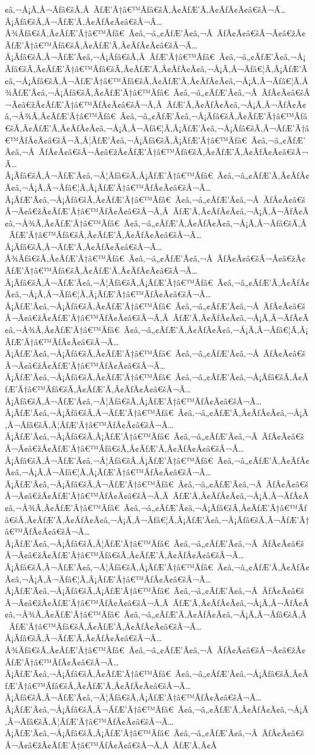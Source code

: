 \documentclass{article}
\begin{document}
\begin{outline}[enumerate]
¢â‚¬Å¡Ã‚Â¬Ãƒâ€šÃ‚Â ÃƒÆ’Ã†â€™Ãƒâ€šÃ‚Â¢ÃƒÆ’Ã‚Â¢ÃƒÂ¢Ã¢â€šÂ¬Ã…Â¡Ãƒâ€šÃ‚Â¬ÃƒÆ’Ã‚Â¢ÃƒÂ¢Ã¢â€šÂ¬Ã…Â¾Ãƒâ€šÃ‚Â¢ÃƒÆ’Ã†â€™Ãƒâ€ Ã¢â‚¬â„¢ÃƒÆ’Ã¢â‚¬Â ÃƒÂ¢Ã¢â€šÂ¬Ã¢â€žÂ¢ÃƒÆ’Ã†â€™Ãƒâ€šÃ‚Â¢ÃƒÆ’Ã‚Â¢ÃƒÂ¢Ã¢â€šÂ¬Ã…Â¡Ãƒâ€šÃ‚Â¬ÃƒÆ’Ã¢â‚¬Å¡Ãƒâ€šÃ‚Â ÃƒÆ’Ã†â€™Ãƒâ€ Ã¢â‚¬â„¢ÃƒÆ’Ã¢â‚¬Å¡Ãƒâ€šÃ‚Â¢ÃƒÆ’Ã†â€™Ãƒâ€šÃ‚Â¢ÃƒÆ’Ã‚Â¢ÃƒÂ¢Ã¢â‚¬Å¡Ã‚Â¬Ãƒâ€¦Ã‚Â¡ÃƒÆ’Ã¢â‚¬Å¡Ãƒâ€šÃ‚Â¬ÃƒÆ’Ã†â€™Ãƒâ€šÃ‚Â¢ÃƒÆ’Ã‚Â¢ÃƒÂ¢Ã¢â‚¬Å¡Ã‚Â¬Ãƒâ€¦Ã‚Â¾ÃƒÆ’Ã¢â‚¬Å¡Ãƒâ€šÃ‚Â¢ÃƒÆ’Ã†â€™Ãƒâ€ Ã¢â‚¬â„¢ÃƒÆ’Ã¢â‚¬Â ÃƒÂ¢Ã¢â€šÂ¬Ã¢â€žÂ¢ÃƒÆ’Ã†â€™ÃƒÂ¢Ã¢â€šÂ¬Ã‚Â ÃƒÆ’Ã‚Â¢ÃƒÂ¢Ã¢â‚¬Å¡Ã‚Â¬ÃƒÂ¢Ã¢â‚¬Å¾Ã‚Â¢ÃƒÆ’Ã†â€™Ãƒâ€ Ã¢â‚¬â„¢ÃƒÆ’Ã¢â‚¬Å¡Ãƒâ€šÃ‚Â¢ÃƒÆ’Ã†â€™Ãƒâ€šÃ‚Â¢ÃƒÆ’Ã‚Â¢ÃƒÂ¢Ã¢â‚¬Å¡Ã‚Â¬Ãƒâ€¦Ã‚Â¡ÃƒÆ’Ã¢â‚¬Å¡Ãƒâ€šÃ‚Â¬ÃƒÆ’Ã†â€™ÃƒÂ¢Ã¢â€šÂ¬Ã‚Â¦ÃƒÆ’Ã¢â‚¬Å¡Ãƒâ€šÃ‚Â¡ÃƒÆ’Ã†â€™Ãƒâ€ Ã¢â‚¬â„¢ÃƒÆ’Ã¢â‚¬Â ÃƒÂ¢Ã¢â€šÂ¬Ã¢â€žÂ¢ÃƒÆ’Ã†â€™Ãƒâ€šÃ‚Â¢ÃƒÆ’Ã‚Â¢ÃƒÂ¢Ã¢â€šÂ¬Ã…Â¡Ãƒâ€šÃ‚Â¬ÃƒÆ’Ã¢â‚¬Â¦Ãƒâ€šÃ‚Â¡ÃƒÆ’Ã†â€™Ãƒâ€ Ã¢â‚¬â„¢ÃƒÆ’Ã‚Â¢ÃƒÂ¢Ã¢â‚¬Å¡Ã‚Â¬Ãƒâ€¦Ã‚Â¡ÃƒÆ’Ã†â€™ÃƒÂ¢Ã¢â€šÂ¬Ã…Â¡ÃƒÆ’Ã¢â‚¬Å¡Ãƒâ€šÃ‚Â¢ÃƒÆ’Ã†â€™Ãƒâ€ Ã¢â‚¬â„¢ÃƒÆ’Ã¢â‚¬Â ÃƒÂ¢Ã¢â€šÂ¬Ã¢â€žÂ¢ÃƒÆ’Ã†â€™ÃƒÂ¢Ã¢â€šÂ¬Ã‚Â ÃƒÆ’Ã‚Â¢ÃƒÂ¢Ã¢â‚¬Å¡Ã‚Â¬ÃƒÂ¢Ã¢â‚¬Å¾Ã‚Â¢ÃƒÆ’Ã†â€™Ãƒâ€ Ã¢â‚¬â„¢ÃƒÆ’Ã‚Â¢ÃƒÂ¢Ã¢â‚¬Å¡Ã‚Â¬Ãƒâ€šÃ‚Â ÃƒÆ’Ã†â€™Ãƒâ€šÃ‚Â¢ÃƒÆ’Ã‚Â¢ÃƒÂ¢Ã¢â€šÂ¬Ã…Â¡Ãƒâ€šÃ‚Â¬ÃƒÆ’Ã‚Â¢ÃƒÂ¢Ã¢â€šÂ¬Ã…Â¾Ãƒâ€šÃ‚Â¢ÃƒÆ’Ã†â€™Ãƒâ€ Ã¢â‚¬â„¢ÃƒÆ’Ã¢â‚¬Â ÃƒÂ¢Ã¢â€šÂ¬Ã¢â€žÂ¢ÃƒÆ’Ã†â€™Ãƒâ€šÃ‚Â¢ÃƒÆ’Ã‚Â¢ÃƒÂ¢Ã¢â€šÂ¬Ã…Â¡Ãƒâ€šÃ‚Â¬ÃƒÆ’Ã¢â‚¬Â¦Ãƒâ€šÃ‚Â¡ÃƒÆ’Ã†â€™Ãƒâ€ Ã¢â‚¬â„¢ÃƒÆ’Ã‚Â¢ÃƒÂ¢Ã¢â‚¬Å¡Ã‚Â¬Ãƒâ€¦Ã‚Â¡ÃƒÆ’Ã†â€™ÃƒÂ¢Ã¢â€šÂ¬Ã…Â¡ÃƒÆ’Ã¢â‚¬Å¡Ãƒâ€šÃ‚Â¢ÃƒÆ’Ã†â€™Ãƒâ€ Ã¢â‚¬â„¢ÃƒÆ’Ã¢â‚¬Â ÃƒÂ¢Ã¢â€šÂ¬Ã¢â€žÂ¢ÃƒÆ’Ã†â€™ÃƒÂ¢Ã¢â€šÂ¬Ã‚Â ÃƒÆ’Ã‚Â¢ÃƒÂ¢Ã¢â‚¬Å¡Ã‚Â¬ÃƒÂ¢Ã¢â‚¬Å¾Ã‚Â¢ÃƒÆ’Ã†â€™Ãƒâ€ Ã¢â‚¬â„¢ÃƒÆ’Ã‚Â¢ÃƒÂ¢Ã¢â‚¬Å¡Ã‚Â¬Ãƒâ€¦Ã‚Â¡ÃƒÆ’Ã†â€™ÃƒÂ¢Ã¢â€šÂ¬Ã…Â¡ÃƒÆ’Ã¢â‚¬Å¡Ãƒâ€šÃ‚Â¢ÃƒÆ’Ã†â€™Ãƒâ€ Ã¢â‚¬â„¢ÃƒÆ’Ã¢â‚¬Â ÃƒÂ¢Ã¢â€šÂ¬Ã¢â€žÂ¢ÃƒÆ’Ã†â€™ÃƒÂ¢Ã¢â€šÂ¬Ã…Â¡ÃƒÆ’Ã¢â‚¬Å¡Ãƒâ€šÃ‚Â¢ÃƒÆ’Ã†â€™Ãƒâ€ Ã¢â‚¬â„¢ÃƒÆ’Ã¢â‚¬Å¡Ãƒâ€šÃ‚Â¢ÃƒÆ’Ã†â€™Ãƒâ€šÃ‚Â¢ÃƒÆ’Ã‚Â¢ÃƒÂ¢Ã¢â€šÂ¬Ã…Â¡Ãƒâ€šÃ‚Â¬ÃƒÆ’Ã¢â‚¬Â¦Ãƒâ€šÃ‚Â¡ÃƒÆ’Ã†â€™ÃƒÂ¢Ã¢â€šÂ¬Ã…Â¡ÃƒÆ’Ã¢â‚¬Å¡Ãƒâ€šÃ‚Â¬ÃƒÆ’Ã†â€™Ãƒâ€ Ã¢â‚¬â„¢ÃƒÆ’Ã‚Â¢ÃƒÂ¢Ã¢â‚¬Å¡Ã‚Â¬Ãƒâ€šÃ‚Â¦ÃƒÆ’Ã†â€™ÃƒÂ¢Ã¢â€šÂ¬Ã…Â¡ÃƒÆ’Ã¢â‚¬Å¡Ãƒâ€šÃ‚Â¡ÃƒÆ’Ã†â€™Ãƒâ€ Ã¢â‚¬â„¢ÃƒÆ’Ã¢â‚¬Â ÃƒÂ¢Ã¢â€šÂ¬Ã¢â€žÂ¢ÃƒÆ’Ã†â€™Ãƒâ€šÃ‚Â¢ÃƒÆ’Ã‚Â¢ÃƒÂ¢Ã¢â€šÂ¬Ã…Â¡Ãƒâ€šÃ‚Â¬ÃƒÆ’Ã¢â‚¬Â¦Ãƒâ€šÃ‚Â¡ÃƒÆ’Ã†â€™Ãƒâ€ Ã¢â‚¬â„¢ÃƒÆ’Ã‚Â¢ÃƒÂ¢Ã¢â‚¬Å¡Ã‚Â¬Ãƒâ€¦Ã‚Â¡ÃƒÆ’Ã†â€™ÃƒÂ¢Ã¢â€šÂ¬Ã…Â¡ÃƒÆ’Ã¢â‚¬Å¡Ãƒâ€šÃ‚Â¬ÃƒÆ’Ã†â€™Ãƒâ€ Ã¢â‚¬â„¢ÃƒÆ’Ã¢â‚¬Â ÃƒÂ¢Ã¢â€šÂ¬Ã¢â€žÂ¢ÃƒÆ’Ã†â€™ÃƒÂ¢Ã¢â€šÂ¬Ã‚Â ÃƒÆ’Ã‚Â¢ÃƒÂ¢Ã¢â‚¬Å¡Ã‚Â¬ÃƒÂ¢Ã¢â‚¬Å¾Ã‚Â¢ÃƒÆ’Ã†â€™Ãƒâ€ Ã¢â‚¬â„¢ÃƒÆ’Ã¢â‚¬Å¡Ãƒâ€šÃ‚Â¢ÃƒÆ’Ã†â€™Ãƒâ€šÃ‚Â¢ÃƒÆ’Ã‚Â¢ÃƒÂ¢Ã¢â‚¬Å¡Ã‚Â¬Ãƒâ€¦Ã‚Â¡ÃƒÆ’Ã¢â‚¬Å¡Ãƒâ€šÃ‚Â¬ÃƒÆ’Ã†â€™ÃƒÂ¢Ã¢â€šÂ¬Ã…Â¡ÃƒÆ’Ã¢â‚¬Å¡Ãƒâ€šÃ‚Â¦ÃƒÆ’Ã†â€™Ãƒâ€ Ã¢â‚¬â„¢ÃƒÆ’Ã¢â‚¬Â ÃƒÂ¢Ã¢â€šÂ¬Ã¢â€žÂ¢ÃƒÆ’Ã†â€™Ãƒâ€šÃ‚Â¢ÃƒÆ’Ã‚Â¢ÃƒÂ¢Ã¢â€šÂ¬Ã…Â¡Ãƒâ€šÃ‚Â¬ÃƒÆ’Ã¢â‚¬Â¦Ãƒâ€šÃ‚Â¡ÃƒÆ’Ã†â€™Ãƒâ€ Ã¢â‚¬â„¢ÃƒÆ’Ã‚Â¢ÃƒÂ¢Ã¢â‚¬Å¡Ã‚Â¬Ãƒâ€¦Ã‚Â¡ÃƒÆ’Ã†â€™ÃƒÂ¢Ã¢â€šÂ¬Ã…Â¡ÃƒÆ’Ã¢â‚¬Å¡Ãƒâ€šÃ‚Â¡ÃƒÆ’Ã†â€™Ãƒâ€ Ã¢â‚¬â„¢ÃƒÆ’Ã¢â‚¬Â ÃƒÂ¢Ã¢â€šÂ¬Ã¢â€žÂ¢ÃƒÆ’Ã†â€™ÃƒÂ¢Ã¢â€šÂ¬Ã‚Â ÃƒÆ’Ã‚Â¢ÃƒÂ¢Ã¢â‚¬Å¡Ã‚Â¬ÃƒÂ¢Ã¢â‚¬Å¾Ã‚Â¢ÃƒÆ’Ã†â€™Ãƒâ€ Ã¢â‚¬â„¢ÃƒÆ’Ã‚Â¢ÃƒÂ¢Ã¢â‚¬Å¡Ã‚Â¬Ãƒâ€šÃ‚Â ÃƒÆ’Ã†â€™Ãƒâ€šÃ‚Â¢ÃƒÆ’Ã‚Â¢ÃƒÂ¢Ã¢â€šÂ¬Ã…Â¡Ãƒâ€šÃ‚Â¬ÃƒÆ’Ã‚Â¢ÃƒÂ¢Ã¢â€šÂ¬Ã…Â¾Ãƒâ€šÃ‚Â¢ÃƒÆ’Ã†â€™Ãƒâ€ Ã¢â‚¬â„¢ÃƒÆ’Ã¢â‚¬Â ÃƒÂ¢Ã¢â€šÂ¬Ã¢â€žÂ¢ÃƒÆ’Ã†â€™ÃƒÂ¢Ã¢â€šÂ¬Ã…Â¡ÃƒÆ’Ã¢â‚¬Å¡Ãƒâ€šÃ‚Â¢ÃƒÆ’Ã†â€™Ãƒâ€ Ã¢â‚¬â„¢ÃƒÆ’Ã¢â‚¬Å¡Ãƒâ€šÃ‚Â¢ÃƒÆ’Ã†â€™Ãƒâ€šÃ‚Â¢ÃƒÆ’Ã‚Â¢ÃƒÂ¢Ã¢â€šÂ¬Ã…Â¡Ãƒâ€šÃ‚Â¬ÃƒÆ’Ã¢â‚¬Â¦Ãƒâ€šÃ‚Â¡ÃƒÆ’Ã†â€™ÃƒÂ¢Ã¢â€šÂ¬Ã…Â¡ÃƒÆ’Ã¢â‚¬Å¡Ãƒâ€šÃ‚Â¬ÃƒÆ’Ã†â€™Ãƒâ€ Ã¢â‚¬â„¢ÃƒÆ’Ã‚Â¢ÃƒÂ¢Ã¢â‚¬Å¡Ã‚Â¬Ãƒâ€šÃ‚Â¦ÃƒÆ’Ã†â€™ÃƒÂ¢Ã¢â€šÂ¬Ã…Â¡ÃƒÆ’Ã¢â‚¬Å¡Ãƒâ€šÃ‚Â¡ÃƒÆ’Ã†â€™Ãƒâ€ Ã¢â‚¬â„¢ÃƒÆ’Ã¢â‚¬Â ÃƒÂ¢Ã¢â€šÂ¬Ã¢â€žÂ¢ÃƒÆ’Ã†â€™ÃƒÂ¢Ã¢â€šÂ¬Ã‚Â ÃƒÆ’Ã‚Â¢Ã
\end{outline}
\end{document}
